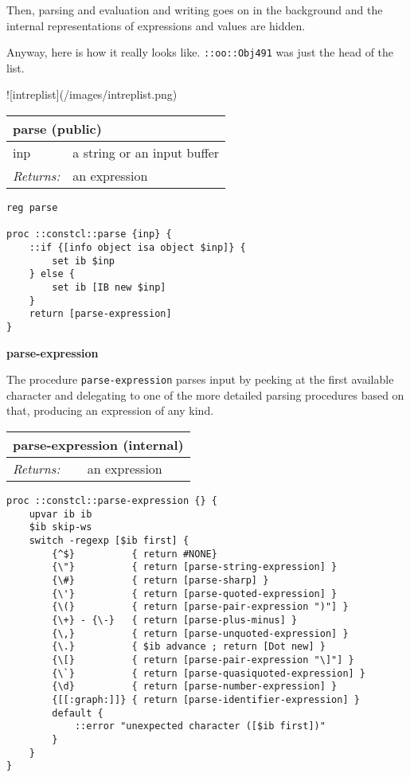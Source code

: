 \documentclass{report}
\begin{document}
Then, parsing and evaluation and writing goes on in the background and the internal representations of expressions and values are hidden.


Anyway, here is how it really looks like. \texttt{::oo::Obj491} was just the head of the list.


![intreplist](/images/intreplist.png)

\begin{tabular}{ |l l| }
\hline
\multicolumn{2}{|l|}{parse (public)} \\
\hline
inp & a string or an input buffer \\
\textit{Returns:} & an expression \\
\hline
\end{tabular}

\noindent\makebox[\linewidth]{\rule{\linewidth}{0.4pt}}
\begin{lstlisting}
reg parse
 
proc ::constcl::parse {inp} {
    ::if {[info object isa object $inp]} {
        set ib $inp
    } else {
        set ib [IB new $inp]
    }
    return [parse-expression]
}
\end{lstlisting}
\noindent\makebox[\linewidth]{\rule{\linewidth}{0.4pt}}

\textbf{parse-expression}


The procedure \texttt{parse-expression} parses input by peeking at the first available character and delegating to one of the more detailed parsing procedures based on that, producing an expression of any kind.

\begin{tabular}{ |l l| }
\hline
\multicolumn{2}{|l|}{parse-expression (internal)} \\
\hline
\textit{Returns:} & an expression \\
\hline
\end{tabular}

\noindent\makebox[\linewidth]{\rule{\linewidth}{0.4pt}}
\begin{lstlisting}
proc ::constcl::parse-expression {} {
    upvar ib ib
    $ib skip-ws
    switch -regexp [$ib first] {
        {^$}          { return #NONE}
        {\"}          { return [parse-string-expression] }
        {\#}          { return [parse-sharp] }
        {\'}          { return [parse-quoted-expression] }
        {\(}          { return [parse-pair-expression ")"] }
        {\+} - {\-}   { return [parse-plus-minus] }
        {\,}          { return [parse-unquoted-expression] }
        {\.}          { $ib advance ; return [Dot new] }
        {\[}          { return [parse-pair-expression "\]"] }
        {\`}          { return [parse-quasiquoted-expression] }
        {\d}          { return [parse-number-expression] }
        {[[:graph:]]} { return [parse-identifier-expression] }
        default {
            ::error "unexpected character ([$ib first])"
        }
    }
}
\end{lstlisting}
\noindent\makebox[\linewidth]{\rule{\linewidth}{0.4pt}}
\end{document}
